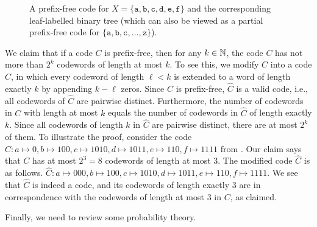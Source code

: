 \documentclass[format=acmsmall, review=false, screen=true]{acmart}
\begin{document}
\begin{figure}
  \caption{A prefix-free code for 
    $X=\{\mathtt{a},\mathtt{b},\mathtt{c},\mathtt{d},\mathtt{e},
    \mathtt{f}\}$
    and the corresponding leaf-labelled binary tree (which can also be
    viewed as a partial prefix-free code for 
    $\{\mathtt{a},\mathtt{b},\mathtt{c},\ldots,\mathtt{z}\}$).}
\end{figure}

We claim that if a code $C$ is prefix-free, then for any
$k \in \mathbb{N}$, the code $C$ has 
not more than $2^k$ codewords of length at most $k$.
To see this, we modify $C$ 
into a code $\widehat C$, in which every codeword of length
$\ell <k$ is extended to a word of length exactly $k$ by 
appending $k-\ell$ zeros.
Since $C$ is prefix-free, $\widehat C$
is a valid code, i.e., all codewords of $\widehat C$ 
are pairwise distinct. 
Furthermore, the number of codewords in $C$ with length
at most $k$ equals the number of codewords in $\widehat C$ of 
length exactly $k$.
Since all codewords of length $k$ in $\widehat C$ are pairwise
distinct, there are at most $2^k$ of them.
To illustrate the proof, consider the code
$C: a \mapsto 0, b \mapsto 100, c \mapsto 1010, d \mapsto 1011,
e \mapsto 110, f \mapsto 1111$ from .
Our claim says that $C$ has at most $2^3 = 8$ codewords of length
at most $3$. The modified code
$\widehat{C}$ is as follows.
$\widehat{C}: a \mapsto 000, b \mapsto 100, c \mapsto 1010, d \mapsto 1011,
e \mapsto 110, f \mapsto 1111$. We see that $\widehat{C}$ is indeed
a code, and its
codewords of length exactly $3$ are in correspondence with the codewords
of length at most $3$ in $C$, as claimed.

Finally, we need to review some probability theory.
\end{document}
